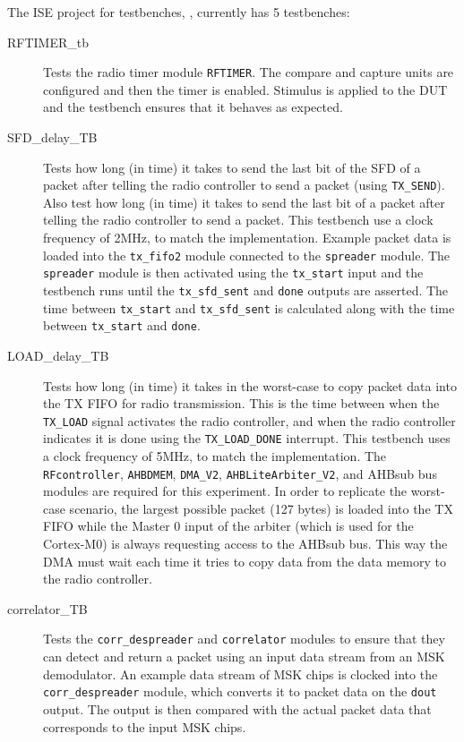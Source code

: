 The ISE project for testbenches, , currently has 5 testbenches:

\begin{description}
	\item[RFTIMER\_tb] Tests the radio timer module \texttt{RFTIMER}. The compare and capture units are configured and then the timer is enabled. Stimulus is applied to the DUT and the testbench ensures that it behaves as expected.
	\item[SFD\_delay\_TB] Tests how long (in time) it takes to send the last bit of the SFD of a packet after telling the radio controller to send a packet (using \texttt{TX\_SEND}). Also test how long (in time) it takes to send the last bit of a packet after telling the radio controller to send a packet. This testbench use a clock frequency of 2MHz, to match the implementation. Example packet data is loaded into the \texttt{tx\_fifo2} module connected to the \texttt{spreader} module. The \texttt{spreader} module is then activated using the \texttt{tx\_start} input and the testbench runs until the \texttt{tx\_sfd\_sent} and \texttt{done} outputs are asserted. The time between \texttt{tx\_start} and \texttt{tx\_sfd\_sent} is calculated along with the time between \texttt{tx\_start} and \texttt{done}.
	\item[LOAD\_delay\_TB] Tests how long (in time) it takes in the worst-case to copy packet data into the TX FIFO for radio transmission. This is the time between when the \texttt{TX\_LOAD} signal activates the radio controller, and when the radio controller indicates it is done using the \texttt{TX\_LOAD\_DONE} interrupt. This testbench uses a clock frequency of 5MHz, to match the implementation. The \texttt{RFcontroller}, \texttt{AHBDMEM}, \texttt{DMA\_V2}, \texttt{AHBLiteArbiter\_V2}, and AHBsub bus modules are required for this experiment. In order to replicate the worst-case scenario, the largest possible packet (127 bytes) is loaded into the TX FIFO while the Master 0 input of the arbiter (which is used for the Cortex-M0) is always requesting access to the AHBsub bus. This way the DMA must wait each time it tries to copy data from the data memory to the radio controller.
	\item[correlator\_TB] Tests the \texttt{corr\_despreader} and \texttt{correlator} modules to ensure that they can detect and return a packet using an input data stream from an MSK demodulator. An example data stream of MSK chips is clocked into the \texttt{corr\_despreader} module, which converts it to packet data on the \texttt{dout} output. The output is then compared with the actual packet data that corresponds to the input MSK chips.

\end{description}
